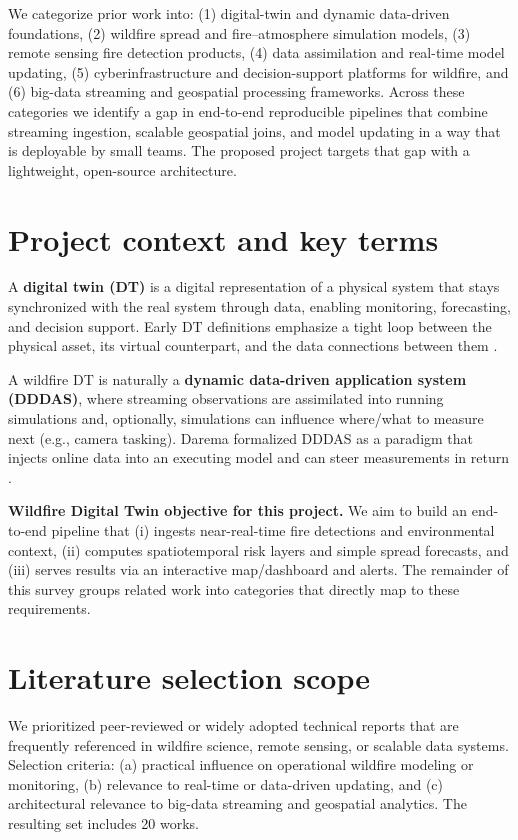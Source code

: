 \documentclass[acmsmall,screen,nonacm]{acmart}
\begin{document}
We categorize prior work into: (1) digital-twin and dynamic data-driven foundations, (2) wildfire spread and
fire--atmosphere simulation models, (3) remote sensing fire detection products, (4) data assimilation and
real-time model updating, (5) cyberinfrastructure and decision-support platforms for wildfire, and (6) big-data
streaming and geospatial processing frameworks. Across these categories we identify a gap in end-to-end
reproducible pipelines that combine streaming ingestion, scalable geospatial joins, and model updating in a
way that is deployable by small teams. The proposed project targets that gap with a lightweight, open-source
architecture.

\section{Project context and key terms}
A \textbf{digital twin (DT)} is a digital representation of a physical system that stays synchronized with the
real system through data, enabling monitoring, forecasting, and decision support. Early DT definitions
emphasize a tight loop between the physical asset, its virtual counterpart, and the data connections between
them \cite{grieves2014digitaltwin}.

A wildfire DT is naturally a \textbf{dynamic data-driven application system (DDDAS)}, where streaming
observations are assimilated into running simulations and, optionally, simulations can influence where/what to
measure next (e.g., camera tasking). Darema formalized DDDAS as a paradigm that injects online data into an
executing model and can steer measurements in return \cite{darema2004dddas}.

\textbf{Wildfire Digital Twin objective for this project.} We aim to build an end-to-end pipeline that
(i) ingests near-real-time fire detections and environmental context, (ii) computes spatiotemporal risk layers
and simple spread forecasts, and (iii) serves results via an interactive map/dashboard and alerts. The remainder
of this survey groups related work into categories that directly map to these requirements.

\section{Literature selection scope}
We prioritized peer-reviewed or widely adopted technical reports that are frequently referenced in wildfire
science, remote sensing, or scalable data systems. Selection criteria: (a) practical influence on operational
wildfire modeling or monitoring, (b) relevance to real-time or data-driven updating, and (c) architectural
relevance to big-data streaming and geospatial analytics. The resulting set includes 20 works.
\end{document}
